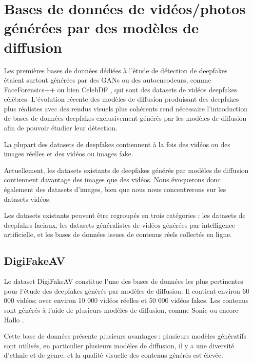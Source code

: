 \documentclass[runningheads]{llncs}
\begin{document}

\section{Bases de données de vidéos/photos générées par des modèles de diffusion}

Les premières bases de données dédiées à l'étude de détection de deepfakes étaient surtout générées par des GANs ou des autoencodeurs, comme FaceForensics++ \citep{rossler2019faceforensics} ou bien CelebDF \citep{li}, qui sont des datasets de vidéos deepfakes célèbres. L'évolution récente des modèles de diffusion produisant des deepfakes plus réalistes avec des rendus visuels plus cohérents rend nécessaire l'introduction de bases de données deepfakes exclusivement générés par les modèles de diffusion afin de pouvoir étudier leur détection.

\bigskip

La plupart des datasets de deepfakes contiennent à la fois des vidéos ou des images réelles et des vidéos ou images fake.

Actuellement, les datasets existants de deepfakes générés par modèles de diffusion contiennent davantage des images que des vidéos. Nous évoquerons donc également des datasets d'images, bien que nous nous concentrerons sur les datasets vidéos.

Les datasets existants peuvent être regroupés en trois catégories : les datasets de deepfakes faciaux, les datasets généralistes de vidéos générées par intelligence artificielle, et les bases de données issues de contenus réels collectés en ligne.

\subsection{DigiFakeAV}

Le dataset DigiFakeAV \citep{liu} constitue l’une des bases de données les plus pertinentes pour l’étude des deepfakes générés par modèles de diffusion. Il contient environ 60 000 vidéos; avec environ 10 000 vidéos réelles et 50 000 vidéos fakes. Les contenus sont générés à l’aide de plusieurs modèles de diffusion, comme Sonic \citep{ji} ou encore Hallo \citep{xu}.

Cette base de données présente plusieurs avantages : plusieurs modèles génératifs sont utilisés, en particulier plusieurs modèles de diffusion, il y a une diversité d’ethnie et de genre, et la qualité visuelle des contenus générés est élevée.
\end{document}
